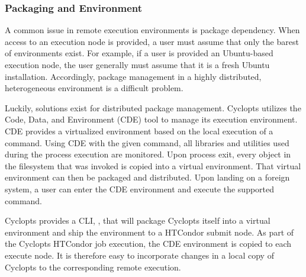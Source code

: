 \subsubsection{Packaging and Environment}

A common issue in remote execution environments is package dependency. When
access to an execution node is provided, a user must assume that only the barest
of environments exist. For example, if a user is provided an Ubuntu-based
execution node, the user generally must assume that it is a fresh Ubuntu
installation. Accordingly, package management in a highly distributed,
heterogeneous environment is a difficult problem.

Luckily, solutions exist for distributed package management. Cyclopts utilizes
the Code, Data, and Environment (CDE) \cite{cde} tool to manage its execution
environment. CDE provides a virtualized environment based on the local execution
of a command. Using CDE with the given command, all libraries and utilities used
during the process execution are monitored. Upon process exit, every object in
the filesystem that was invoked is copied into a virtual environment. That
virtual environment can then be packaged and distributed. Upon landing on a
foreign system, a user can enter the CDE environment and execute the supported
command.

Cyclopts provides a CLI, , that will package Cyclopts itself
into a virtual environment and ship the environment to a HTCondor submit node. As
part of the Cyclopts HTCondor job execution, the CDE environment is copied to each
execute node. It is therefore easy to incorporate changes in a local copy of
Cyclopts to the corresponding remote execution.
